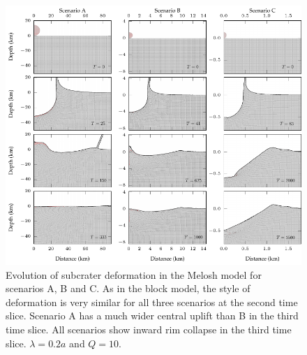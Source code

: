 \begin{figure}[!t]
\centering
\includegraphics[width=0.99\linewidth]{./images/melosh_deformation.pdf}
\caption{Evolution of subcrater deformation in the Melosh model for scenarios A, B and C. As in the block model, the style of deformation is very similar for all three scenarios at the second time slice. Scenario A  has a much wider central uplift than B in the third time slice. All scenarios show inward rim collapse in the third time slice. $\lambda=0.2a$ and $Q=10$. \label{fig:melosh_deformation}}
\end{figure}




